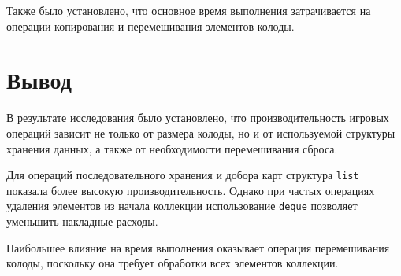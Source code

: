 Также было установлено, что основное время выполнения затрачивается на операции
копирования и перемешивания элементов колоды.

\section*{Вывод}

В результате исследования было установлено, что производительность игровых
операций зависит не только от размера колоды, но и от используемой структуры
хранения данных, а также от необходимости перемешивания сброса.

Для операций последовательного хранения и добора карт структура \texttt{list}
показала более высокую производительность. Однако при частых операциях удаления
элементов из начала коллекции использование \texttt{deque} позволяет уменьшить
накладные расходы.

Наибольшее влияние на время выполнения оказывает операция перемешивания колоды,
поскольку она требует обработки всех элементов коллекции.
